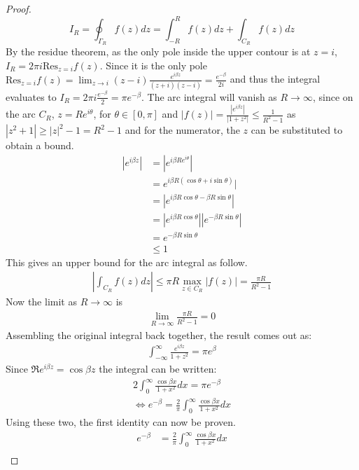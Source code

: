\begin{proof}
\begin{equation*}
        I_R=\oint_{\Gamma_R}f(z)dz=\int_{-R}^Rf(z)dz+\int_{C_R}f(z)dz
    \end{equation*}
    By the residue theorem, as the only pole inside the upper contour is at $z=i$, $I_R=2\pi i\text{Res}_{z=i}f(z)$. Since it is the only pole $\text{Res}_{z=i}f(z)=\lim_{z\rightarrow i}(z-i)\frac{e^{i\beta z}}{(z+i)(z-i)}=\frac{e^{-\beta}}{2i}$ and thus the integral evaluates to $I_R=2\pi i \frac{e^{-\beta}}{2}=\pi e^{-\beta}$. The arc integral will vanish as $R\rightarrow\infty$, since on the arc $C_R$, $z=Re^{i\theta}$, for $\theta\in[0,\pi]$ and $|f(z)|=\frac{|e^{i\beta z}|}{|1+z^2|}\leq\frac{1}{R^2-1}$ as $|z^2+1|\geq|z|^2-1=R^2-1$ and for the numerator, the $z$ can be substituted to obtain a bound.
    \begin{align*}
        |e^{i\beta z}|&=|e^{i\beta Re^{i\theta}}|\\
        &=e^{i\beta R(\cos{\theta}+i\sin{\theta})}|\\
        &=|e^{i\beta R\cos{\theta}-\beta R\sin{\theta}}| \\
        &=|e^{i\beta R\cos{\theta}}||e^{-\beta R\sin{\theta}}|\\
        &=e^{-\beta R\sin{\theta}} \\
        &\leq 1
    \end{align*}
    This gives an upper bound for the arc integral as follow.
    \begin{gather*}
        |\int_{C_R}f(z)dz|\leq\pi R\max_{z\in C_R}|f(z)|=\frac{\pi R}{R^2-1}
    \end{gather*}
    Now the limit as $R\rightarrow\infty$ is
    \begin{gather*}
        \lim_{R\rightarrow\infty}\frac{\pi R}{R^2-1}=0
    \end{gather*}
    Assembling the original integral back together, the result comes out as:
    \begin{gather*}
        \int_{-\infty}^\infty \frac{e^{i\beta z}}{1+z^2}=\pi e^{\beta}
    \end{gather*}
    Since $\Re{e^{i\beta z}}=\cos{\beta z}$ the integral can be written:
    \begin{gather*}
        2\int_0^\infty\frac{\cos{\beta x}}{1+x^2}dx=\pi e^{-\beta} \\
        \Leftrightarrow e^{-\beta} = \frac{2}{\pi}\int_0^\infty\frac{\cos{\beta x}}{1+x^2}dx
    \end{gather*}
    Using these two, the first identity can now be proven.
    \begin{align*}
        e^{-\beta}&=\frac{2}{\pi}\int_0^\infty\frac{\cos{\beta x}}{1+x^2}dx \\

\end{align*}
\end{proof}
